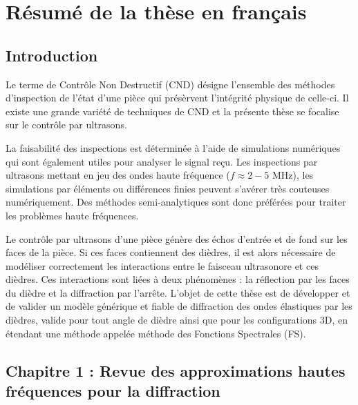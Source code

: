 \chapter[][Résumé de la thèse en français]{Résumé de la thèse en français}

\section[Introduction]{Introduction}

Le terme de Contrôle Non Destructif (CND) désigne l'ensemble des méthodes d'inspection de l'état d'une pièce qui présèrvent l'intégrité physique de celle-ci. Il existe une grande variété de techniques de CND et la présente thèse se focalise sur le contrôle par ultrasons. 

La faisabilité des inspections est déterminée à l'aide de simulations numériques qui sont également utiles pour analyser le signal reçu. Les inspections par ultrasons mettant en jeu des ondes haute fréquence ($f\approx2-5$ MHz), les simulations par éléments ou différences finies peuvent s'avérer très couteuses numériquement. Des méthodes semi-analytiques sont donc préférées pour traiter les problèmes haute fréquences.

Le contrôle par ultrasons d'une pièce génère des échos d'entrée et de fond sur les faces de la pièce. Si ces faces contiennent des dièdres, il est alors nécessaire de modéliser correctement les interactions entre le faisceau ultrasonore et ces dièdres. Ces interactions sont liées à deux phénomènes : la réflection par les faces du dièdre et la diffraction par l'arrête. L'objet de cette thèse est de développer et de valider un modèle générique et fiable de diffraction des ondes élastiques par les dièdres, valide pour tout angle de dièdre ainsi que pour les configurations 3D, en étendant une méthode appelée méthode des Fonctions Spectrales (FS).


\section[Chapitre 1]{Chapitre 1 : Revue des approximations hautes fréquences pour la diffraction}


